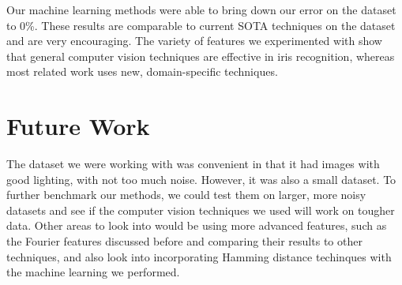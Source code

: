 \documentclass[12pt]{article}
\begin{document}
Our machine learning methods were able to bring down our error on the dataset to 0\%. These results are comparable to current SOTA techniques on the dataset and are very encouraging. The variety of features we experimented with show that general computer vision techniques are effective in iris recognition, whereas most related work uses new, domain-specific techniques. 

\section{Future Work}
\label{sec:future}

The dataset we were working with was convenient in that it had images with good lighting, with not too much noise. However, it was also a small dataset. To further benchmark our methods, we could test them on larger, more noisy datasets and see if the computer vision techniques we used will work on tougher data. Other areas to look into would be using more advanced features, such as the Fourier features discussed before and comparing their results to other techniques, and also look into incorporating Hamming distance techinques with the machine learning we performed.



\end{document}
